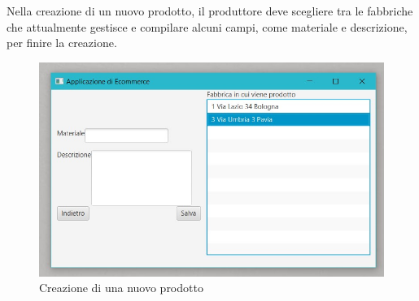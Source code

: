 \documentclass[a4paper,12pt]{report}
\begin{document}
Nella creazione di un nuovo prodotto, il produttore deve scegliere tra le fabbriche che attualmente gestisce e compilare alcuni campi, 
come materiale e descrizione, per finire la creazione.
\begin{figure}[H]
	\centering{}
	\includegraphics[width=\textwidth]{img/Application/Producer3.jpg}
	\caption{Creazione di una nuovo prodotto}
\end{figure}
\end{document}
